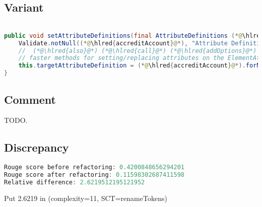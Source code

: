\documentclass[11pt]{article}
\DeclareRobustCommand{\hlred}[1]{{\sethlcolor{YellowOrange}\hl{#1}}}
\begin{document}
\subsection{Variant}

\begin{lstlisting}[language=java]

public void setAttributeDefinitions(final AttributeDefinitions (*@\hlred{accreditAccount}@*)) {
    Validate.notNull((*@\hlred{accreditAccount}@*), "Attribute Definitions cannot be null");
    //  (*@\hlred{also}@*) (*@\hlred{call}@*) (*@\hlred{addOptions}@*) (*@\hlred{or}@*) (*@\hlred{apply}@*) (*@\hlred{options}@*) (*@\hlred{on}@*) (*@\hlred{it}@*) (*@\hlred{and}@*) (*@\hlred{addTo}@*) (*@\hlred{instead}@*) to (*@\hlred{implement}@*) (*@\hlred{any}@*)
    // faster methods for setting/replacing attributes on the ElementAttributes implementation
    this.targetAttributeDefinition = (*@\hlred{accreditAccount}@*).forName(getTemplateMode(), this.targetAttrCompleteName);
}
\end{lstlisting}

\subsection{Comment}

TODO.

\subsection{Discrepancy}

\begin{lstlisting}[language=java]
Rouge score before refactoring: 0.4200848656294201
Rouge score after refactoring: 0.11598302687411598
Relative difference: 2.6219512195121952
\end{lstlisting}

Put 2.6219 in (complexity=11, SCT=renameTokens)
\end{document}
